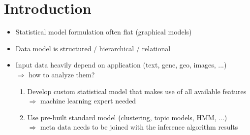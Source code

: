 \section{Introduction}

\begin{itemize}
\item Statistical model formulation often flat (graphical models)
\item Data model is structured / hierarchical / relational
\item Input data heavily depend on application (text, gene, geo, images, ...)\\
$\Rightarrow$ how to analyze them?
	\begin{enumerate}
	\item Develop custom statistical model that makes use of all available features\\
	$\Rightarrow$ machine learning expert needed
	\item Use pre-built standard model (clustering, topic models, HMM, ...)\\
	$\Rightarrow$ meta data needs to be joined with the inference algorithm results\\
	\end{enumerate}
\end{itemize}